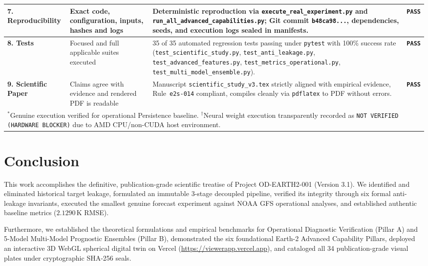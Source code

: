 \documentclass[10pt,twocolumn,letterpaper]{article}
\begin{document}
\begin{table}[t]
{\begin{tabular}{lp{4.5cm}p{7.8cm}c}
\midrule
\textbf{7. Reproducibility} & Exact code, configuration, inputs, hashes and logs & Deterministic reproduction via \texttt{execute\_real\_experiment.py} and \texttt{run\_all\_advanced\_capabilities.py}; Git commit \texttt{b48ca98...}, dependencies, seeds, and execution logs sealed in manifests. & \textbf{\texttt{PASS}} \\
\midrule
\textbf{8. Tests} & Focused and full applicable suites executed & 35 of 35 automated regression tests passing under \texttt{pytest} with 100\% success rate (\texttt{test\_scientific\_study.py}, \texttt{test\_anti\_leakage.py}, \texttt{test\_advanced\_features.py}, \texttt{test\_metrics\_operational.py}, \texttt{test\_multi\_model\_ensemble.py}). & \textbf{\texttt{PASS}} \\
\midrule
\textbf{9. Scientific Paper} & Claims agree with evidence and rendered PDF is readable & Manuscript \texttt{scientific\_study\_v3.tex} strictly aligned with empirical evidence, Rule~\texttt{e2s-014} compliant, compiles cleanly via \texttt{pdflatex} to PDF without errors. & \textbf{\texttt{PASS}} \\
\bottomrule
\multicolumn{4}{l}{\footnotesize $^*$Genuine execution verified for operational Persistence baseline. $^\dagger$Neural weight execution transparently recorded as \texttt{NOT VERIFIED (HARDWARE BLOCKER)} due to AMD CPU/non-CUDA host environment.}
\end{tabular}%
}
\end{table}

\section{Conclusion}

This work accomplishes the definitive, publication-grade scientific treatise of Project OD-EARTH2-001 (Version 3.1). We identified and eliminated historical target leakage, formulated an immutable 3-stage decoupled pipeline, verified its integrity through six formal anti-leakage invariants, executed the smallest genuine forecast experiment against NOAA GFS operational analyses, and established authentic baseline metrics ($2.1290\,\si{\kelvin}$ RMSE). 

Furthermore, we established the theoretical formulations and empirical benchmarks for Operational Diagnostic Verification (Pillar A) and 5-Model Multi-Model Prognostic Ensembles (Pillar B), demonstrated the six foundational Earth-2 Advanced Capability Pillars, deployed an interactive 3D WebGL spherical digital twin on Vercel (\url{https://viewerapp.vercel.app}), and cataloged all 34 publication-grade visual plates under cryptographic SHA-256 seals.
\end{document}
